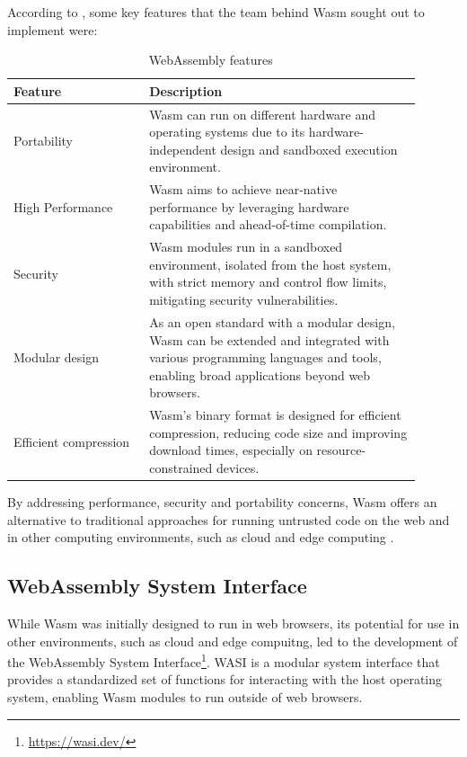 \documentclass[
  table]{report}
\begin{document}
According to \citet{haasBringingWebSpeed2017}, some key features that
the team behind \ac{Wasm} sought out to implement were:

\begin{table}[ht]
\centering
\caption{WebAssembly features}
\begin{tabular}{@{}p{0.3\linewidth}@{\hskip\tabcolsep}p{0.6\linewidth}@{}}
\toprule
\textbf{Feature} & \textbf{Description} \\
\midrule

\rowcolor{green!10} Portability & Wasm can run on different hardware and
operating systems due to its hardware-independent design and sandboxed
execution environment. \\

High Performance & Wasm aims to achieve near-native performance by leveraging
hardware capabilities and ahead-of-time compilation. \\

\rowcolor{green!10} Security & Wasm modules run in a sandboxed environment,
isolated from the host system, with strict memory and control flow limits,
mitigating security vulnerabilities. \\

Modular design & As an open standard with a modular design, Wasm can be
extended and integrated with various programming languages and tools, enabling
broad applications beyond web browsers. \\

\rowcolor{green!10} Efficient compression & Wasm's binary format is designed for
efficient compression, reducing code size and improving download times,
especially on resource-constrained devices. \\

\bottomrule
\end{tabular}
\label{table:wasm_benefits}
\end{table}

By addressing performance, security and portability concerns, \ac{Wasm}
offers an alternative to traditional approaches for running untrusted
code on the web and in other computing environments, such as cloud and
edge computing \citep{haasBringingWebSpeed2017}.

\subsection{WebAssembly System Interface}

While \ac{Wasm} was initially designed to run in web browsers, its
potential for use in other environments, such as cloud and edge
compuitng, led to the development of the WebAssembly System
Interface\footnote{\url{https://wasi.dev/}}. \ac{WASI} is a modular
system interface that provides a standardized set of functions for
interacting with the host operating system, enabling \ac{Wasm} modules
to run outside of web browsers.
\end{document}
